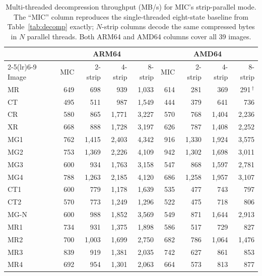 \documentclass[journal]{IEEEtran}
\begin{document}
\begin{table}[htbp]
\centering
\caption{Multi-threaded decompression throughput (MB/s) for MIC's
strip-parallel mode. The ``MIC'' column reproduces the single-threaded
eight-state baseline from Table~\ref{tab:decomp} exactly; $N$-strip columns
decode the same compressed bytes in $N$ parallel threads. Both ARM64 and
AMD64 columns cover all 39 images.}
\label{tab:pics}
\scriptsize
\begin{tabular}{l|rrrr|rrrr}
\toprule
 & \multicolumn{4}{c|}{ARM64} & \multicolumn{4}{c}{AMD64} \\
\cmidrule(lr){2-5}\cmidrule(lr){6-9}
Image & MIC & 2-strip & 4-strip & 8-strip & MIC & 2-strip & 4-strip & 8-strip \\
\midrule
MR                   & 649 & 698 & 939 & 1{,}033 & 614 & 281 & 369 & 291\,$^\dagger$ \\
CT                   & 495 & 511 & 987 & 1{,}549 & 444 & 379 & 641 & 736 \\
CR                   & 580 & 865 & 1{,}771 & 3{,}227 & 570 & 768 & 1{,}404 & 2{,}236 \\
XR                   & 668 & 888 & 1{,}728 & 3{,}197 & 626 & 787 & 1{,}408 & 2{,}252 \\
MG1                  & 762 & 1{,}415 & 2{,}403 & 4{,}342 & 916 & 1{,}330 & 1{,}924 & 3{,}575 \\
MG2                  & 753 & 1{,}369 & 2{,}226 & 4{,}109 & 942 & 1{,}302 & 1{,}698 & 3{,}011 \\
MG3                  & 600 & 934 & 1{,}763 & 3{,}158 & 547 & 868 & 1{,}597 & 2{,}781 \\
MG4                  & 788 & 1{,}263 & 2{,}185 & 4{,}120 & 686 & 1{,}258 & 1{,}957 & 3{,}107 \\
CT1                  & 600 & 779 & 1{,}178 & 1{,}639 & 535 & 477 & 743 & 797 \\
CT2                  & 570 & 773 & 1{,}249 & 1{,}296 & 522 & 475 & 718 & 806 \\
MG-N                 & 600 & 988 & 1{,}852 & 3{,}569 & 549 & 871 & 1{,}644 & 2{,}913 \\
MR1                  & 734 & 931 & 1{,}375 & 1{,}898 & 586 & 517 & 729 & 827 \\
MR2                  & 700 & 1{,}003 & 1{,}699 & 2{,}750 & 682 & 786 & 1{,}064 & 1{,}476 \\
MR3                  & 839 & 919 & 1{,}381 & 2{,}035 & 742 & 627 & 861 & 853 \\
MR4                  & 692 & 954 & 1{,}301 & 2{,}063 & 664 & 573 & 813 & 877 \\

\end{tabular}
\end{table}
\end{document}
